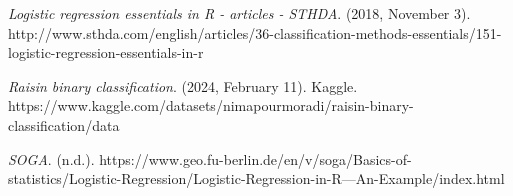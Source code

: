 \documentclass{article}
\begin{document}
\begin{thebibliography}{9}

\emph{Logistic regression essentials in R - articles - STHDA}. (2018, November 3). http://www.sthda.com/english/articles/36-classification-methods-essentials/151-logistic-regression-essentials-in-r

\emph{Raisin binary classification}. (2024, February 11). Kaggle. https://www.kaggle.com/datasets/nimapourmoradi/raisin-binary-classification/data


\emph{SOGA}. (n.d.). https://www.geo.fu-berlin.de/en/v/soga/Basics-of-statistics/Logistic-Regression/Logistic-Regression-in-R---An-Example/index.html


\end{thebibliography}
\end{document}

